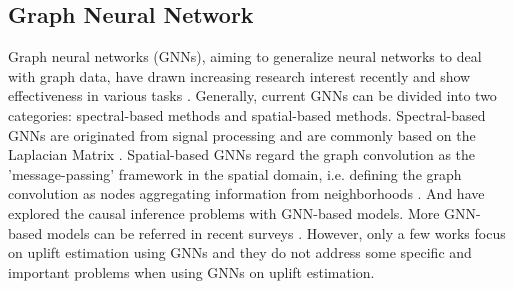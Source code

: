 \subsection{Graph Neural Network}
Graph neural networks (GNNs), aiming to generalize neural networks to deal with graph data, have drawn increasing research interest recently \cite{bronstein2017geometric,zhang2020deep} and show effectiveness in various tasks \cite{wang2017community,fan2020graph,zhang2021graph}. Generally, current GNNs can be divided into two categories: spectral-based methods and spatial-based methods. Spectral-based GNNs are originated from signal processing and are commonly based on the Laplacian Matrix \cite{bruna2014spectral,defferrard2016convolutional,kipf2017semi}.  Spatial-based GNNs regard the graph convolution as the 'message-passing' framework in the spatial domain, i.e. defining the graph convolution as nodes aggregating information from neighborhoods  \cite{gilmer2017neural,hamilton2017inductive}. And \cite{feng2021should, sui2022causal, ding2022causal} have explored the causal inference problems with GNN-based models. More GNN-based models can be referred in recent surveys \cite{wu2020comprehensive,zhang2020deep}. However, only a few works focus on uplift estimation using GNNs and they do not address some specific and important problems when using GNNs on uplift estimation. 

